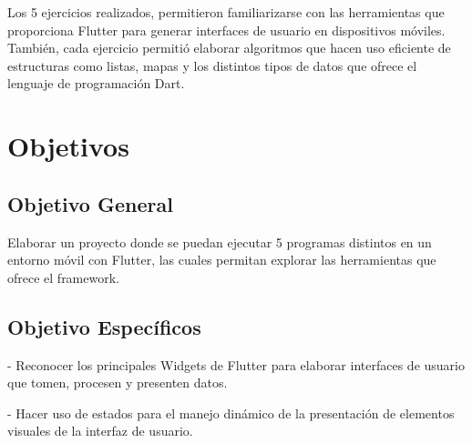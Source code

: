 \documentclass[12pt,letterpaper]{article}
\begin{document}
Los 5 ejercicios realizados, permitieron familiarizarse con las herramientas que proporciona Flutter para generar interfaces de usuario en dispositivos móviles. También, cada ejercicio permitió elaborar algoritmos que hacen uso eficiente de estructuras como listas, mapas y los distintos tipos de datos que ofrece el lenguaje de programación Dart.

\newpage


\renewcommand{\contentsname}{Índice de Contenidos}
{\setlength{\parskip}{0pt}
\tableofcontents
}

\vspace{1.0cm}

\renewcommand{\listfigurename}{Índice de Ilustraciones}
{\setlength{\cftbeforefigskip}{2pt}
\listoffigures
}

\newpage


\section{Objetivos}
\subsection{Objetivo General}
Elaborar un proyecto donde se puedan ejecutar 5 programas distintos en un entorno móvil con Flutter, las cuales permitan explorar las herramientas que ofrece el framework.

\subsection{Objetivo Específicos}
- Reconocer los principales Widgets de Flutter para elaborar interfaces de usuario que tomen, procesen y presenten datos.

- Hacer uso de estados para el manejo dinámico de la presentación de elementos visuales de la interfaz de usuario.
\end{document}
